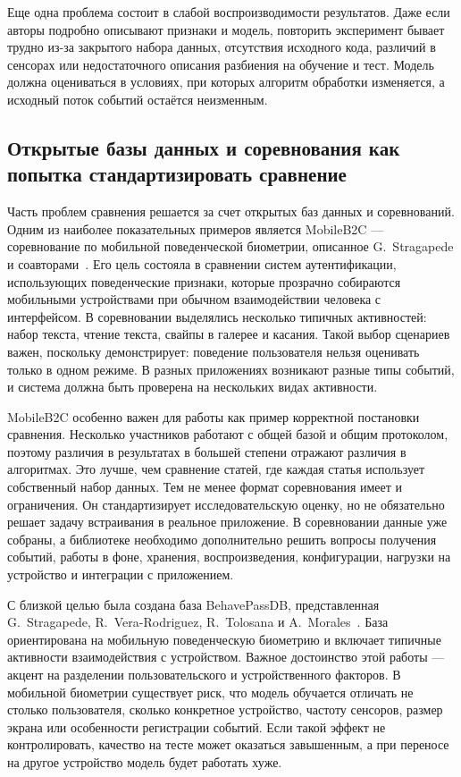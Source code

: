 \documentclass[oneside,senior,etd]{BYUPhys}
\begin{document}
Еще одна проблема состоит в слабой воспроизводимости результатов. Даже если авторы подробно описывают признаки и модель, повторить эксперимент бывает трудно из-за закрытого набора данных, отсутствия исходного кода, различий в сенсорах или недостаточного описания разбиения на обучение и тест. Модель должна оцениваться в условиях, при которых алгоритм обработки изменяется, а исходный поток событий остаётся неизменным.

\subsection{Открытые базы данных и соревнования как попытка стандартизировать сравнение}

Часть проблем сравнения решается за счет открытых баз данных и соревнований. Одним из наиболее показательных примеров является MobileB2C --- соревнование по мобильной поведенческой биометрии, описанное G.~Stragapede и соавторами~\cite{mobileb2c2022}. Его цель состояла в сравнении систем аутентификации, использующих поведенческие признаки, которые прозрачно собираются мобильными устройствами при обычном взаимодействии человека с интерфейсом. В соревновании выделялись несколько типичных активностей: набор текста, чтение текста, свайпы в галерее и касания. Такой выбор сценариев важен, поскольку демонстрирует: поведение пользователя нельзя оценивать только в одном режиме. В разных приложениях возникают разные типы событий, и система должна быть проверена на нескольких видах активности.

MobileB2C особенно важен для работы как пример корректной постановки сравнения. Несколько участников работают с общей базой и общим протоколом, поэтому различия в результатах в большей степени отражают различия в алгоритмах. Это лучше, чем сравнение статей, где каждая статья использует собственный набор данных. Тем не менее формат соревнования имеет и ограничения. Он стандартизирует исследовательскую оценку, но не обязательно решает задачу встраивания в реальное приложение. В соревновании данные уже собраны, а библиотеке необходимо дополнительно решить вопросы получения событий, работы в фоне, хранения, воспроизведения, конфигурации, нагрузки на устройство и интеграции с приложением.

С близкой целью была создана база BehavePassDB, представленная G.~Stragapede, R.~Vera-Rodriguez, R.~Tolosana и A.~Morales~\cite{behavepassdb2023}. База ориентирована на мобильную поведенческую биометрию и включает типичные активности взаимодействия с устройством. Важное достоинство этой работы --- акцент на разделении пользовательского и устройственного факторов. В мобильной биометрии существует риск, что модель обучается отличать не столько пользователя, сколько конкретное устройство, частоту сенсоров, размер экрана или особенности регистрации событий. Если такой эффект не контролировать, качество на тесте может оказаться завышенным, а при переносе на другое устройство модель будет работать хуже.
\end{document}
